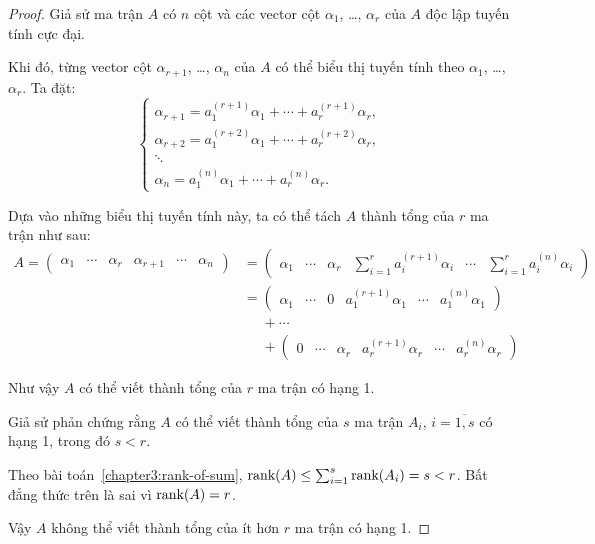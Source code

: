 \begin{proof}
    Giả sử ma trận $A$ có $n$ cột và các vector cột $\alpha_{1}$, \ldots, $\alpha_{r}$ của $A$ độc lập tuyến tính cực đại.
    
    Khi đó, từng vector cột $\alpha_{r+1}$, \ldots, $\alpha_{n}$ của $A$ có thể biểu thị tuyến tính theo $\alpha_{1}$, \ldots, $\alpha_{r}$. Ta đặt:
    \[
        \begin{cases}
            \alpha_{r+1} = a_{1}^{(r+1)}\alpha_{1} + \cdots + a_{r}^{(r+1)}\alpha_{r}, \\
            \alpha_{r+2} = a_{1}^{(r+2)}\alpha_{1} + \cdots + a_{r}^{(r+2)}\alpha_{r}, \\
            \ddots                                                                     \\
            \alpha_{n} = a_{1}^{(n)}\alpha_{1} + \cdots + a_{r}^{(n)}\alpha_{r}.
        \end{cases}
    \]
    
    Dựa vào những biểu thị tuyến tính này, ta có thể tách $A$ thành tổng của $r$ ma trận như sau:
    \begin{align*}
        A = \begin{pmatrix}
                \alpha_{1} & \cdots & \alpha_{r} & \alpha_{r+1} & \cdots & \alpha_{n}
            \end{pmatrix}
         & =
        \begin{pmatrix}
            \alpha_{1} & \cdots & \alpha_{r} & \sum^{r}_{i=1}a_{i}^{(r+1)}\alpha_{i} & \cdots & \sum^{r}_{i=1}a_{i}^{(n)}\alpha_{i}
        \end{pmatrix} \\
         & =
        \begin{pmatrix}
            \alpha_{1} & \cdots & 0 & a_{1}^{(r+1)}\alpha_{1} & \cdots & a_{1}^{(n)}\alpha_{1}
        \end{pmatrix}                                      \\
         & \phantom{=} + \cdots                                                                                                 \\
         & \phantom{=} + \begin{pmatrix}
                             0 & \cdots & \alpha_{r} & a_{r}^{(r+1)}\alpha_{r} & \cdots & a_{r}^{(n)}\alpha_{r}
                         \end{pmatrix}
    \end{align*}
    
    Như vậy $A$ có thể viết thành tổng của $r$ ma trận có hạng 1.
    
    \bigskip
    
    Giả sử phản chứng rằng $A$ có thể viết thành tổng của $s$ ma trận $A_{i}$, $i = \overline{1,s}$ có hạng 1, trong đó $s < r$.
    
    Theo bài toán~\ref{chapter3:rank-of-sum}, $\text{rank}(A)\le \sum^{s}_{i=1}\text{rank}(A_{i}) = s < r$. Bất đẳng thức trên là sai vì $\text{rank}(A) = r$.
    
    Vậy $A$ không thể viết thành tổng của ít hơn $r$ ma trận có hạng 1.
\end{proof}

